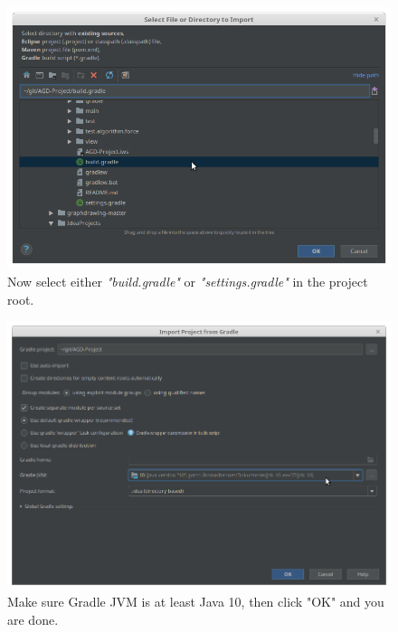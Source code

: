 \begin{figure}[H]
	\includegraphics[width=\textwidth]{setup-parts/pictures/idea-import-2.png}
	\caption{Now select either \textit{"build.gradle"} or \textit{"settings.gradle"} in the project root.}
\end{figure}

\begin{figure}[H]
	\includegraphics[width=\textwidth]{setup-parts/pictures/idea-import-3.png}
	\caption{Make sure Gradle JVM is at least Java 10, then click "OK" and you are done.}
\end{figure}